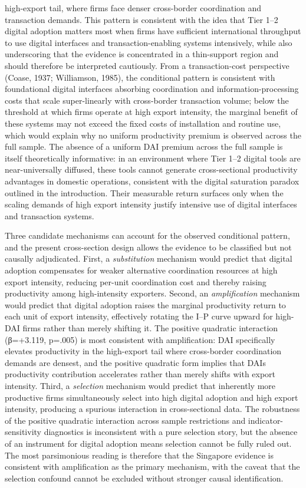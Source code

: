 \documentclass[12pt,a4paper]{article}
\begin{document}
high-export tail, where firms face denser cross-border coordination and
transaction demands. This pattern is consistent with the idea that Tier
1--2 digital adoption matters most when firms have sufficient
international throughput to use digital interfaces and
transaction-enabling systems intensively, while also underscoring that
the evidence is concentrated in a thin-support region and should
therefore be interpreted cautiously. From a transaction-cost perspective
(Coase, 1937; Williamson, 1985), the conditional pattern is consistent
with foundational digital interfaces absorbing coordination and
information-processing costs that scale super-linearly with cross-border
transaction volume; below the threshold at which firms operate at high
export intensity, the marginal benefit of these systems may not exceed
the fixed costs of installation and routine use, which would explain why
no uniform productivity premium is observed across the full sample. The
absence of a uniform DAI premium across the full sample is itself
theoretically informative: in an environment where Tier 1--2 digital
tools are near-universally diffused, these tools cannot generate
cross-sectional productivity advantages in domestic operations,
consistent with the digital saturation paradox outlined in the
introduction. Their measurable return surfaces only when the scaling
demands of high export intensity justify intensive use of digital
interfaces and transaction systems.

Three candidate mechanisms can account for the observed conditional
pattern, and the present cross-section design allows the evidence to be
classified but not causally adjudicated. First, a \emph{substitution}
mechanism would predict that digital adoption compensates for weaker
alternative coordination resources at high export intensity, reducing
per-unit coordination cost and thereby raising productivity among
high-intensity exporters. Second, an \emph{amplification} mechanism
would predict that digital adoption raises the marginal productivity
return to each unit of export intensity, effectively rotating the I--P
curve upward for high-DAI firms rather than merely shifting it. The
positive quadratic interaction (β=+3.119, p=.005) is most consistent
with amplification: DAI specifically elevates productivity in the
high-export tail where cross-border coordination demands are densest,
and the positive quadratic form implies that DAI\textquotesingle s
productivity contribution accelerates rather than merely shifts with
export intensity. Third, a \emph{selection} mechanism would predict that
inherently more productive firms simultaneously select into high digital
adoption and high export intensity, producing a spurious interaction in
cross-sectional data. The robustness of the positive quadratic
interaction across sample restrictions and indicator-sensitivity
diagnostics is inconsistent with a pure selection story, but the absence
of an instrument for digital adoption means selection cannot be fully
ruled out. The most parsimonious reading is therefore that the Singapore
evidence is consistent with amplification as the primary mechanism, with
the caveat that the selection confound cannot be excluded without
stronger causal identification.
\end{document}
